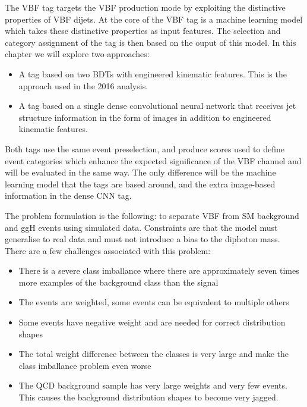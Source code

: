 The VBF tag targets the VBF production mode by exploiting the distinctive properties of VBF dijets. 
At the core of the VBF tag is a machine learning model which takes these distinctive properties as input features. 
The selection and category assignment of the tag is then based on the ouput of this model.
In this chapter we will explore two approaches:
\begin{itemize}[leftmargin=.5in,noitemsep]
    \item A tag based on two BDTs with engineered kinematic features. This is the approach used in the 2016 \Hgg analysis. 
    \item A tag based on a single dense convolutional neural network that receives jet structure information in the form of images in addition to engineered kinematic features. 
\end{itemize}
Both tags use the same event preselection, and produce scores used to define event categories which enhance the expected significance of the VBF channel and will be evaluated in the same way. The only difference will be the machine learning model that the tags are based around, and the extra image-based information in the dense CNN tag.  

The problem formulation is the following: to separate VBF from SM background and ggH events using simulated data. 
Constraints are that the model must generalise to real data and must not introduce a bias to the diphoton mass. 
There are a few challenges associated with this problem:
\begin{itemize}[leftmargin=.5in,noitemsep]
    \item There is a severe class imballance where there are approximately seven times more examples of the background class than the signal
    \item The events are weighted, some events can be equivalent to multiple others
    \item Some events have negative weight and are needed for correct distribution shapes
    \item The total weight difference between the classes is very large and make the class imballance problem even worse
    \item The QCD background sample has very large weights and very few events. This causes the background distribution shapes to become very jagged. 
\end{itemize}



